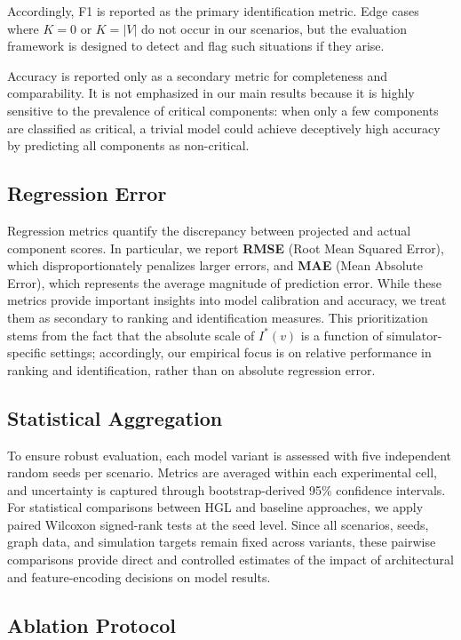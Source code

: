 \documentclass[review]{elsarticle}
\begin{document}
Accordingly, F1 is reported as the primary identification metric. Edge cases where $K=0$ or
$K=|V|$ do not occur in our scenarios, but the evaluation framework is designed to detect and flag
such situations if they arise.

Accuracy is reported only as a secondary metric for completeness and comparability. It is not
emphasized in our main results because it is highly sensitive to the prevalence of critical
components: when only a few components are classified as critical, a trivial model could achieve
deceptively high accuracy by predicting all components as non-critical.

\subsection{Regression Error}

Regression metrics quantify the discrepancy between projected and actual component scores. In
particular, we report \textbf{RMSE} (Root Mean Squared Error), which disproportionately penalizes
larger errors, and \textbf{MAE} (Mean Absolute Error), which represents the average magnitude of
prediction error. While these metrics provide important insights into model calibration and
accuracy, we treat them as secondary to ranking and identification measures. This prioritization
stems from the fact that the absolute scale of $I^*(v)$ is a function of simulator-specific
settings; accordingly, our empirical focus is on relative performance in ranking and
identification, rather than on absolute regression error.

\subsection{Statistical Aggregation}

To ensure robust evaluation, each model variant is assessed with five independent random seeds per
scenario. Metrics are averaged within each experimental cell, and uncertainty is captured through
bootstrap-derived 95\% confidence intervals. For statistical comparisons between HGL and baseline
approaches, we apply paired Wilcoxon signed-rank tests at the seed level. Since all scenarios,
seeds, graph data, and simulation targets remain fixed across variants, these pairwise comparisons
provide direct and controlled estimates of the impact of architectural and feature-encoding
decisions on model results.

\subsection{Ablation Protocol}
\end{document}
